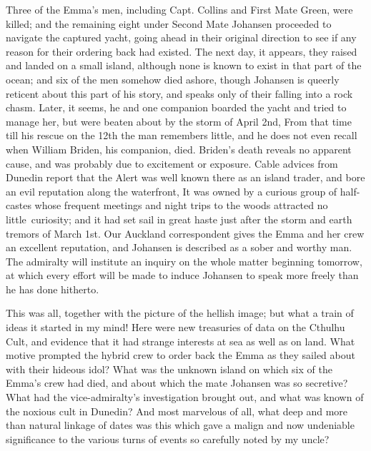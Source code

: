 Three of the Emma's men, including Capt. Collins and First Mate Green,
were killed; and the remaining eight under Second Mate Johansen
proceeded to navigate the captured yacht, going ahead in their original
direction to see if any reason for their ordering back had existed. The
next day, it appears, they raised and landed on a small island, although
none is known to exist in that part of the ocean; and six of the men
somehow died ashore, though Johansen is queerly reticent about this part
of his story, and speaks only of their falling into a rock chasm. Later,
it seems, he and one companion boarded the yacht and tried to manage
her, but were beaten about by the storm of April 2nd, From that time
till his rescue on the 12th the man remembers little, and he does not
even recall when William Briden, his companion, died. Briden's death
reveals no apparent cause, and was probably due to excitement or
exposure. Cable advices from Dunedin report that the Alert was well
known there as an island trader, and bore an evil reputation along the
waterfront, It was owned by a curious group of half-castes whose
frequent meetings and night trips to the woods attracted no little\est\
 curiosity; and it had set sail in great haste just after the storm and
earth tremors of March 1st. Our Auckland correspondent gives the Emma
and her crew an excellent reputation, and Johansen is described as a
sober and worthy man. The admiralty will institute an inquiry on the
whole matter beginning tomorrow, at which every effort will be made to
induce Johansen to speak more freely than he has done hitherto.

This was all, together with the picture of the hellish image; but what a
train of ideas it started in my mind! Here were new treasuries of data
on the Cthulhu Cult, and evidence that it had strange interests at sea
as well as on land. What motive prompted the hybrid crew to order back
the Emma as they sailed about with their hideous idol? What was the
unknown island on which six of the Emma's crew had died, and about which
the mate Johansen was so secretive? What had the vice-admiralty's
investigation brought out, and what was known of the noxious cult in
Dunedin? And most marvelous of all, what deep and more than natural
linkage of dates was this which gave a malign and now undeniable
significance to the various turns of events so carefully noted by my
uncle?

